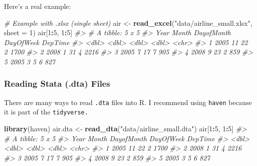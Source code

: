 \documentclass[]{book}
\newenvironment{Shaded}{\begin{snugshade}}{\end{snugshade}}
\newcommand{\KeywordTok}[1]{\textcolor[rgb]{0.13,0.29,0.53}{\textbf{#1}}}
\newcommand{\DataTypeTok}[1]{\textcolor[rgb]{0.13,0.29,0.53}{#1}}
\newcommand{\DecValTok}[1]{\textcolor[rgb]{0.00,0.00,0.81}{#1}}
\newcommand{\StringTok}[1]{\textcolor[rgb]{0.31,0.60,0.02}{#1}}
\newcommand{\CommentTok}[1]{\textcolor[rgb]{0.56,0.35,0.01}{\textit{#1}}}
\newcommand{\OperatorTok}[1]{\textcolor[rgb]{0.81,0.36,0.00}{\textbf{#1}}}
\newcommand{\NormalTok}[1]{#1}
\begin{document}
Here's a real example:

\begin{Shaded}
\begin{Highlighting}[]
\CommentTok{# Example with .xlsx (single sheet)}
\NormalTok{air <-}\StringTok{ }\KeywordTok{read_excel}\NormalTok{(}\StringTok{"data/airline_small.xlsx"}\NormalTok{, }\DataTypeTok{sheet =} \DecValTok{1}\NormalTok{) }
\NormalTok{air[}\DecValTok{1}\OperatorTok{:}\DecValTok{5}\NormalTok{, }\DecValTok{1}\OperatorTok{:}\DecValTok{5}\NormalTok{]}
\CommentTok{#> # A tibble: 5 x 5}
\CommentTok{#>    Year Month DayofMonth DayOfWeek DepTime}
\CommentTok{#>   <dbl> <dbl>      <dbl>     <dbl> <chr>  }
\CommentTok{#> 1  2005    11         22         2 1700   }
\CommentTok{#> 2  2008     1         31         4 2216   }
\CommentTok{#> 3  2005     7         17         7 905    }
\CommentTok{#> 4  2008     9         23         2 859    }
\CommentTok{#> 5  2005     3          5         6 827}
\end{Highlighting}
\end{Shaded}

\subsubsection*{Reading Stata (.dta)
Files}\label{reading-stata-.dta-files}

There are many ways to read \texttt{.dta} files into R. I recommend
using \texttt{haven} because it is part of the \texttt{tidyverse.}

\begin{Shaded}
\begin{Highlighting}[]
\KeywordTok{library}\NormalTok{(haven)}
\NormalTok{air.dta <-}\StringTok{ }\KeywordTok{read_dta}\NormalTok{(}\StringTok{"data/airline_small.dta"}\NormalTok{) }
\NormalTok{air[}\DecValTok{1}\OperatorTok{:}\DecValTok{5}\NormalTok{, }\DecValTok{1}\OperatorTok{:}\DecValTok{5}\NormalTok{]}
\CommentTok{#> # A tibble: 5 x 5}
\CommentTok{#>    Year Month DayofMonth DayOfWeek DepTime}
\CommentTok{#>   <dbl> <dbl>      <dbl>     <dbl> <chr>  }
\CommentTok{#> 1  2005    11         22         2 1700   }
\CommentTok{#> 2  2008     1         31         4 2216   }
\CommentTok{#> 3  2005     7         17         7 905    }
\CommentTok{#> 4  2008     9         23         2 859    }
\CommentTok{#> 5  2005     3          5         6 827}
\end{Highlighting}
\end{Shaded}
\end{document}
